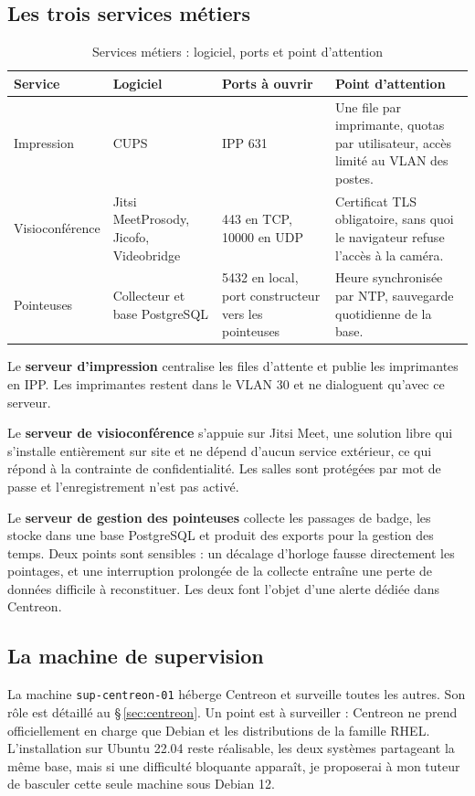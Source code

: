 \documentclass[11pt,a4paper]{article}
\newcommand{\ttb}[1]{\texttt{\small #1}}
\begin{document}
\subsection{Les trois services métiers}
\begin{table}[H]
\centering
\caption{Services métiers : logiciel, ports et point d'attention}
\begin{tabularx}{\textwidth}{L{2.6cm} L{3.1cm} L{2.9cm} Y}
\toprule
{}\textbf{Service} & \textbf{Logiciel} & \textbf{Ports à ouvrir} & \textbf{Point d'attention} \\
\midrule
Impression & CUPS & IPP 631 & Une file par imprimante, quotas par utilisateur, accès limité au VLAN des postes. \\
Visioconférence & Jitsi Meet\newline\footnotesize Prosody, Jicofo, Videobridge & 443 en TCP, 10000 en UDP & Certificat TLS obligatoire, sans quoi le navigateur refuse l'accès à la caméra. \\
Pointeuses & Collecteur et base PostgreSQL & 5432 en local, port constructeur vers les pointeuses & Heure synchronisée par NTP, sauvegarde quotidienne de la base. \\
\bottomrule
\end{tabularx}
\end{table}

Le \textbf{serveur d'impression} centralise les files d'attente et publie les imprimantes en IPP. Les imprimantes restent dans le VLAN 30 et ne dialoguent qu'avec ce serveur.

Le \textbf{serveur de visioconférence} s'appuie sur Jitsi Meet, une solution libre qui s'installe entièrement sur site et ne dépend d'aucun service extérieur, ce qui répond à la contrainte de confidentialité. Les salles sont protégées par mot de passe et l'enregistrement n'est pas activé.

Le \textbf{serveur de gestion des pointeuses} collecte les passages de badge, les stocke dans une base PostgreSQL et produit des exports pour la gestion des temps. Deux points sont sensibles : un décalage d'horloge fausse directement les pointages, et une interruption prolongée de la collecte entraîne une perte de données difficile à reconstituer. Les deux font l'objet d'une alerte dédiée dans Centreon.

\subsection{La machine de supervision}
La machine \ttb{sup-centreon-01} héberge Centreon et surveille toutes les autres. Son rôle est détaillé au \S\,\ref{sec:centreon}. Un point est à surveiller : Centreon ne prend officiellement en charge que Debian et les distributions de la famille RHEL. L'installation sur Ubuntu 22.04 reste réalisable, les deux systèmes partageant la même base, mais si une difficulté bloquante apparaît, je proposerai à mon tuteur de basculer cette seule machine sous Debian 12.
\end{document}
